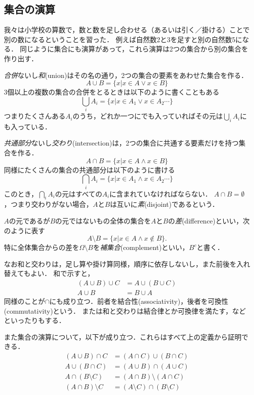 \documentclass[11pt,a4paper]{jsarticle}
\begin{document}
\subsection{集合の演算}
\label{sec:setoperation}
我々は小学校の算数で，数と数を足し合わせる（あるいは引く／掛ける）ことで別の数になるということを習った．
例えば自然数2と3を足すと別の自然数5になる．
同じように集合にも演算があって，これら演算は2つの集合から別の集合を作り出す．

\emph{合併}ないし\emph{和}(union)はその名の通り，2つの集合の要素をあわせた集合を作る．
\[
 A \cup B = \{ x | x \in A \vee x \in B\}
\]
3個以上の複数の集合の合併をとるときは以下のように書くこともある
\[
 \bigcup_i A_i = \{ x | x \in A_1 \vee x \in A_2 \cdots \}
\]
つまりたくさんある$A_i$のうち，どれか一つにでも入っていればその元は$\bigcup_i A_i$にも入っている．

\emph{共通部分}ないし\emph{交わり}(intersection)は，2つの集合に共通する要素だけを持つ集合を作る．
\[
 A \cap B = \{ x | x \in A \wedge x \in B\}
\]
同様にたくさんの集合の共通部分は以下のように書ける
\[
 \bigcap_i A_i = \{ x | x \in A_1 \wedge x \in A_2 \cdots \}
\]
このとき，$\bigcap_i A_i$の元はすべての$A_i$に含まれていなければならない．
$A \cap B = \emptyset$，つまり交わりがない場合，$A$と$B$は互いに\emph{素}(disjoint)であるという．

$A$の元であるが$B$の元ではないもの全体の集合を$A$と$B$の\emph{差}(difference)といい，次のように表す
\[
 A \setminus B = \{ x | x \in A \wedge x \not\in B\}.
\]
特に全体集合からの差を$\Omega \setminus B$を\emph{補集合}(complement)といい，$B^c$と書く．

なお和と交わりは，足し算や掛け算同様，順序に依存しないし，また前後を入れ替えてもよい．
和で示すと，
\begin{align*}
 (A \cup B) \cup C & = A \cup (B \cup C) \\
 A \cup B & = B \cup A
\end{align*}
同様のことが$\cap$にも成り立つ．前者を結合性(associativity)，後者を可換性(commutativity)という．
または和と交わりは結合律とか可換律を満たす，などといったりもする．

また集合の演算について，以下が成り立つ．これらはすべて上の定義から証明できる．
\begin{align}
(A \cup B) \cap C &= (A \cap C) \cup (B \cap C) \\
A \cup (B \cap C) &= (A \cup B) \cap (A \cup C) \\
A \cap (B \setminus C) &= (A \cap B) \setminus (A \cap C) \\
(A \cap B) \setminus C &= (A \setminus C) \cap (B \setminus C) 
\end{align}
\end{document}
